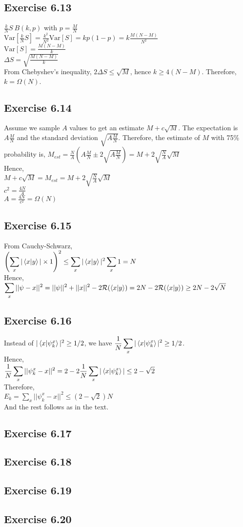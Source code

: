 \documentclass[a4paper,12pt]{article}
\begin{document}
\subsection*{Exercise 6.13}
$\frac{k}{N}S~B(k,p)$ with $p=\frac{M}{N}$\\
$\text{Var}[\frac{k}{N}S]=\frac{k^2}{N^2}\text{Var}[S]=kp(1-p)=
k\frac{M(N-M)}{N^2}$\\
$\text{Var}[S]=\frac{M(N-M)}{k}$\\
$\Delta S=\sqrt{\frac{M(N-M)}{k}}$\\
From Chebyshev's inequality, $2\Delta S\leq \sqrt{M}$, hence $k\geq 4(N-M)$.
Therefore, $k=\Omega(N)$.
\subsection*{Exercise 6.14}
Assume we sample $A$ values to get an estimate $M+c\sqrt{M}$. The expectation is 
$A\frac{M}{N}$ and the standard deviation $\sqrt{A\frac{M}{N}}$. Therefore, the estimate of
$M$ with 75\% probability is, $M_{est}=\frac{N}{A}(A\frac{M}{N}\pm 2\sqrt{A\frac{M}{N}})=
M+2\sqrt{\frac{N}{A}}\sqrt{M}$\\
Hence,\\
$M+c\sqrt{M}=M_{est}=M+2\sqrt{\frac{N}{A}}\sqrt{M}$\\
$c^2=\frac{4N}{A}$\\
$A=\frac{4N}{c^2}=\Omega(N)$
\subsection*{Exercise 6.15}
From Cauchy-Schwarz,\\
$\displaystyle\left(\sum_x|\braket{x|y}|\times 1\right)^2\leq \sum_x |\braket{x|y}|^2\sum_x 1=N$\\
Hence,\\
$\displaystyle\sum_x||\psi-x||^2=||\psi||^2+||x||^2-2\mathcal{R}(\braket{x|y})=
2N-2\mathcal{R}(\braket{x|y})\geq 2N-2\sqrt{N}$
\subsection*{Exercise 6.16}
Instead of $|\braket{x|\psi_k^x}|^2\geq 1/2$, we have
$\displaystyle\frac{1}{N}\sum_x|\braket{x|\psi_k^x}|^2\geq 1/2$.\\
Hence,\\
$\displaystyle\frac{1}{N}\sum_x||\psi_k^x-x||^2=2-2\frac{1}{N}\sum_x|\braket{x|\psi_k^x}|\leq
2-\sqrt{2}$\\
Therefore,\\
$E_k=\displaystyle\sum_x||\psi_k^x-x||^2\leq (2-\sqrt{2})N$\\
And the rest follows as in the text.
\subsection*{Exercise 6.17}

\subsection*{Exercise 6.18}

\subsection*{Exercise 6.19}
\subsection*{Exercise 6.20}
\end{document}
